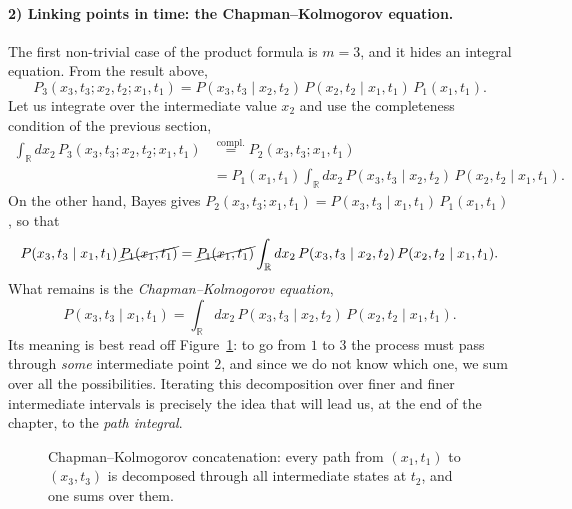 \paragraph{2) Linking points in time: the Chapman--Kolmogorov equation.}
The first non-trivial case of the product formula is $m=3$, and it hides an integral equation.
From the result above,
\begin{equation}
P_3(x_3,t_3;x_2,t_2;x_1,t_1) = P(x_3,t_3\mid x_2,t_2)\,P(x_2,t_2\mid x_1,t_1)\,P_1(x_1,t_1).
\end{equation}
Let us integrate over the intermediate value $x_2$ and use the completeness condition of the previous section,
\begin{equation}\begin{split}
\int_{\mathbb{R}} dx_2\, P_3(x_3,t_3;x_2,t_2;x_1,t_1)
&\overset{\text{compl.}}{=} P_2(x_3,t_3;x_1,t_1)\\
&= P_1(x_1,t_1)\int_{\mathbb{R}} dx_2\, P(x_3,t_3\mid x_2,t_2)\,P(x_2,t_2\mid x_1,t_1).
\end{split}\end{equation}
On the other hand, Bayes gives $P_2(x_3,t_3;x_1,t_1)=P(x_3,t_3\mid x_1,t_1)\,P_1(x_1,t_1)$, so that
\begin{equation}
P(x_3,t_3\mid x_1,t_1)\,\cancel{P_1(x_1,t_1)} = \cancel{P_1(x_1,t_1)}\int_{\mathbb{R}} dx_2\, P(x_3,t_3\mid x_2,t_2)\,P(x_2,t_2\mid x_1,t_1).
\end{equation}
What remains is the \emph{Chapman--Kolmogorov equation},
\begin{equation}
P(x_3,t_3\mid x_1,t_1) = \int_{\mathbb{R}} dx_2\, P(x_3,t_3\mid x_2,t_2)\,P(x_2,t_2\mid x_1,t_1).
\label{eq:chapman-kolmogorov}
\end{equation}
Its meaning is best read off Figure~\ref{fig:chapman-kolmogorov}: to go from $1$ to $3$ the process must pass through \emph{some} intermediate point $2$, and since we do not know which one, we sum over all the possibilities.
Iterating this decomposition over finer and finer intermediate intervals is precisely the idea that will lead us, at the end of the chapter, to the \emph{path integral}.

\begin{figure}[h!]
\centering
{}
\caption{Chapman--Kolmogorov concatenation: every path from $(x_1,t_1)$ to $(x_3,t_3)$ is decomposed through all intermediate states at $t_2$, and one sums over them.}
\label{fig:chapman-kolmogorov}
\end{figure}

